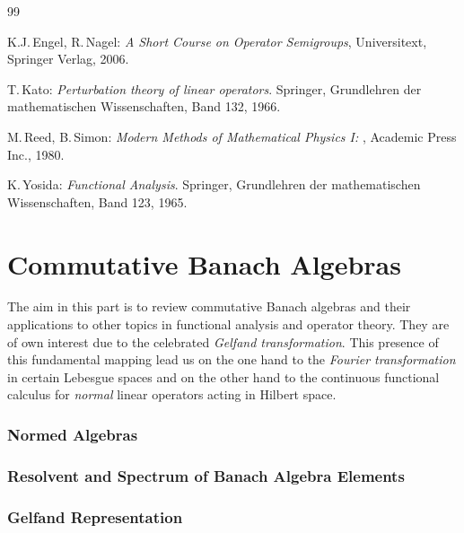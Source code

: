 \documentclass[11pt,twoside]{article}
\begin{document}
\vspace{5mm}
\begin{thebibliography}{99}
\begin{small}

 K.J.\,Engel, R.\,Nagel:
\textit{A Short Course on Operator Semigroups},
Universitext, Springer Verlag, 2006.

 T.\,Kato:
\textit{{Perturbation theory of linear operators}}.
Springer, Grund\-lehren der mathematischen Wissenschaften, Band 132, 1966.

 M.\,Reed, B.\,Simon:
\textit{Modern Methods of Mathematical Physics I: {\FA}},
Academic Press Inc., 1980.

 K.\,Yosida:
\textit{Functional Analysis}.
Springer, Grund\-lehren der mathematischen Wissenschaften, Band 123, 1965.

\end{small}
\end{thebibliography}

\newpage
\thispagestyle{empty}
\part{Commutative Banach Algebras}                                             %
The aim in this part is to review commutative Banach algebras and
their applications to other topics in functional analysis and operator theory.
They are of own interest due to the celebrated \textit{Gelfand transformation}.
This presence of this fundamental mapping lead us
on the one hand
  to the \textit{Fourier transformation} in certain Lebesgue spaces and
on the other hand
  to the continuous functional calculus for \textit{normal} linear operators
  acting in Hilbert space.

\section{Normed Algebras}
\section{Resolvent and Spectrum of Banach Algebra Elements}
\section{Gelfand Representation}
\end{document}
